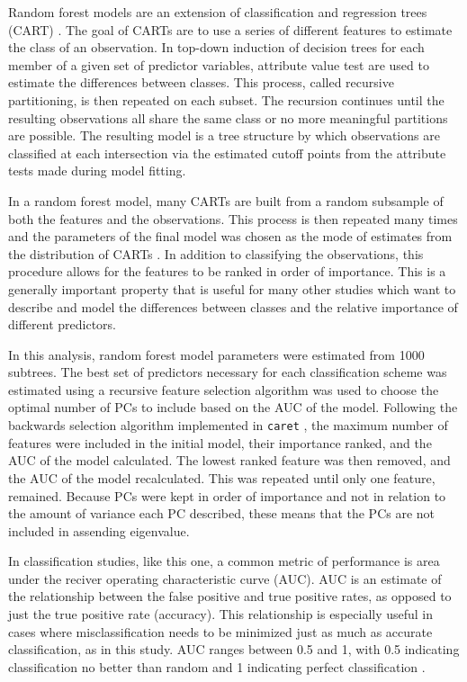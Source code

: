 \documentclass[12pt,letterpaper]{article}
\begin{document}
Random forest models are an extension of classification and regression trees (CART) \citep{Breiman1984,Breiman2001}. The goal of CARTs are to use a series of different features to estimate the class of an observation. In top-down induction of decision trees for each member of a given set of predictor variables, attribute value test are used to estimate the differences between classes. This process, called recursive partitioning, is then repeated on each subset. The recursion continues until the resulting observations all share the same class or no more meaningful partitions are possible. The resulting model is a tree structure by which observations are classified at each intersection via the estimated cutoff points from the attribute tests made during model fitting.

In a random forest model, many CARTs are built from a random subsample of both the features and the observations. This process is then repeated many times and the parameters of the final model was chosen as the mode of estimates from the distribution of CARTs \citep{Breiman2001}. In addition to classifying the observations, this procedure allows for the features to be ranked in order of importance. This is a generally important property that is useful for many other studies which want to describe and model the differences between classes and the relative importance of different predictors. 

In this analysis, random forest model parameters were estimated from 1000 subtrees. The best set of predictors necessary for each classification scheme was estimated using a recursive feature selection algorithm was used to choose the optimal number of PCs to include based on the AUC of the model. Following the backwards selection algorithm implemented in \texttt{caret} \citep{Kuhn2013}, the maximum number of features were included in the initial model, their importance ranked, and the AUC of the model calculated. The lowest ranked feature was then removed, and the AUC of the model recalculated. This was repeated until only one feature, remained. Because PCs were kept in order of importance and not in relation to the amount of variance each PC described, these means that the PCs are not included in assending eigenvalue.

In classification studies, like this one, a common metric of performance is area under the reciver operating characteristic curve (AUC). AUC is an estimate of the relationship between the false positive and true positive rates, as opposed to just the true positive rate (accuracy). This relationship is especially useful in cases where misclassification needs to be minimized just as much as accurate classification, as in this study. AUC ranges between 0.5 and 1, with 0.5 indicating classification no better than random and 1 indicating perfect classification \citep{Hastie2009}.
\end{document}

